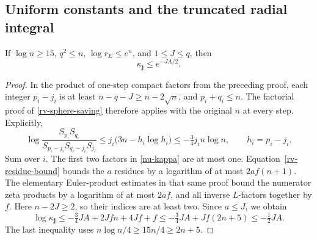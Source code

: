 \subsection{Uniform constants and the truncated radial integral}

\begin{lemma}\label{nu-kappa-bound}
If $\log n\ge15$, $q^2\le n$,
$\log r_E\le e^n$, and $1\le J\le q$, then
\begin{equation}\label{nu-kappa-small}
                         \kappa_{\mathbf j}\le e^{-JA/2}.
\end{equation}
\end{lemma}
\begin{proof}
In the product of one-step compact factors
from the preceding proof, each integer
$p_i-j_i$ is at least $n-q-J\ge n-2\sqrt n$,
and $p_i+q_i\le n$.
The factorial proof of \eqref{rv-sphere-saving}
therefore applies with the original $n$
at every step.  Explicitly,
\[
 \log\frac{S_{p_i}S_{q_i}}
          {S_{p_i-j_i}S_{q_i-j_i}S_{j_i}}
 \le j_i\bigl(3n-h_i\log h_i\bigr)
 \le-\tfrac34j_in\log n,\qquad h_i=p_i-j_i.
\]
Sum over $i$.  The first two factors in
\eqref{nu-kappa} are at most one.
Equation~\eqref{rv-residue-bound} bounds the
$a$ residues by a logarithm of at most
$2af(n+1)$.
The elementary Euler-product estimates in
that same proof bound the numerator zeta
products by a logarithm of at most $2af$,
and all inverse $L$-factors together by $f$.
Here $n-2J\ge2$, so their indices are at least
two.  Since $a\le J$, we obtain
\[
 \log\kappa_{\mathbf j}
 \le-\tfrac34JA+2Jfn+4Jf+f
 \le-\tfrac34JA+Jf(2n+5)
 \le-\tfrac12JA.
\]
The last inequality uses
$n\log n/4\ge 15n/4\ge2n+5$.
\end{proof}


